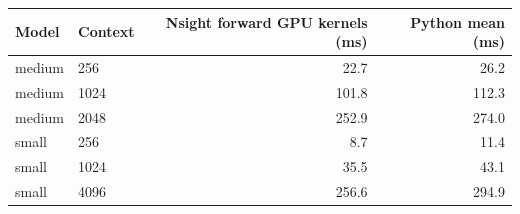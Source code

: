 \begin{tabular}{llrr}
\toprule
Model & Context & Nsight forward GPU kernels (ms) & Python mean (ms) \\
\midrule
medium & 256 & 22.7 & 26.2 \\
medium & 1024 & 101.8 & 112.3 \\
medium & 2048 & 252.9 & 274.0 \\
small & 256 & 8.7 & 11.4 \\
small & 1024 & 35.5 & 43.1 \\
small & 4096 & 256.6 & 294.9 \\
\bottomrule
\end{tabular}
